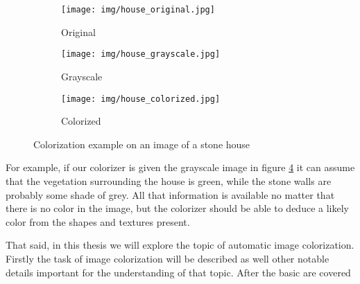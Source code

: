 \begin{figure}[ht!]
	\centering
	\begin{subfigure}{.32\textwidth}
		\centering
		\texttt{[image: img/house\_original.jpg]}
        \caption{Original}
		\label{fig:stone_house:original}
	\end{subfigure}
    \begin{subfigure}{.32\textwidth}
		\centering
		\texttt{[image: img/house\_grayscale.jpg]}
        \caption{Grayscale}
        \label{fig:stone_house:grayscale}
    \end{subfigure}
	\begin{subfigure}{.32\textwidth}
		\centering
		\texttt{[image: img/house\_colorized.jpg]}
        \caption{Colorized}
        \label{fig:stone_house:colorized}
    \end{subfigure}
    \caption{Colorization example on an image of a stone house}
	\label{fig:stone_house}
\end{figure}

For example, if our colorizer is given the grayscale image in figure 
\ref{fig:stone_house} it can assume that the vegetation surrounding the 
house is green, while the stone walls are probably some shade of grey. 
All that information is available no matter that there is no color 
in the image, but the colorizer should be able to deduce a likely color from the 
shapes and textures present. 

That said, in this thesis we will explore the topic of automatic image 
colorization. Firstly the task of image colorization will be described as well 
other notable details important for the understanding of that topic. After the
basic are covered 

\begin{comment}

\textbf{TODO!}


- Technicalities 
- The task of colorization
- Different approaches to image colorization
- Dataset
- Problems with colorization
- Different metrics for assesing the models
- Ground up explinations of the working and training of different models
\end{comment}